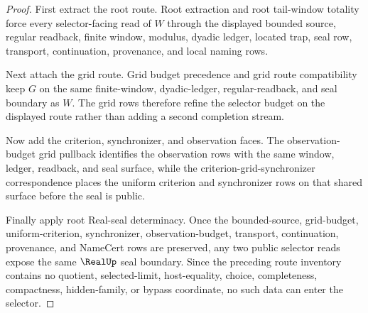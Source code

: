 \begin{proof}
First extract the root route. Root extraction and root tail-window totality force every selector-facing read of $W$ through the displayed bounded source, regular readback, finite window, modulus, dyadic ledger, located trap, seal row, transport, continuation, provenance, and local naming rows.

Next attach the grid route. Grid budget precedence and grid route compatibility keep $G$ on the same finite-window, dyadic-ledger, regular-readback, and seal boundary as $W$. The grid rows therefore refine the selector budget on the displayed route rather than adding a second completion stream.

Now add the criterion, synchronizer, and observation faces. The observation-budget grid pullback identifies the observation rows with the same window, ledger, readback, and seal surface, while the criterion-grid-synchronizer correspondence places the uniform criterion and synchronizer rows on that shared surface before the seal is public.

Finally apply root Real-seal determinacy. Once the bounded-source, grid-budget, uniform-criterion, synchronizer, observation-budget, transport, continuation, provenance, and NameCert rows are preserved, any two public selector reads expose the same $\RealUp$ seal boundary. Since the preceding route inventory contains no quotient, selected-limit, host-equality, choice, completeness, compactness, hidden-family, or bypass coordinate, no such data can enter the selector.
\end{proof}

